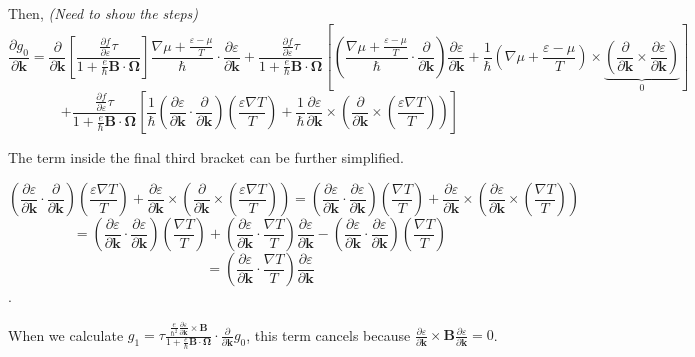 \documentclass[aps,pra,amsmath,amssymb,floatfix,twocolumn, amsmath, superscriptaddress, twocolumn]{revtex4-2}
\newcommand{\bvec}[1]{{\mathbf #1}}
\begin{document}
Then, \textit{(Need to show the steps)}
$$\frac{\partial g_0}{\partial \bvec{k}} = 
\frac{\partial}{\partial \bvec{k}} \left[ \frac{\frac{\partial f} {\partial \varepsilon} \tau}{1 + \frac{e}{\hbar} \bvec{B}\cdot\bvec{\Omega}}
\right] \frac{\nabla \mu + \frac{\varepsilon - \mu}{T}}{\hbar} \cdot \frac{\partial \varepsilon}{\partial \bvec{k}} + \frac{\frac{\partial f} {\partial \varepsilon} \tau}{1 + \frac{e}{\hbar} \bvec{B}\cdot\bvec{\Omega}} \left[(\frac{\nabla \mu + \frac{\varepsilon - \mu}{T}}{\hbar} \cdot \frac{\partial }{\partial \bvec{k}} )\frac{\partial \varepsilon}{\partial \bvec{k}} + \frac{1}{\hbar} (\nabla \mu + \frac{\varepsilon - \mu}{T})\times \underbrace{(\frac{\partial }{\partial \bvec{k}} \times \frac{\partial \varepsilon}{\partial \bvec{k}})}_0 \right]
$$
$$+ \frac{\frac{\partial f} {\partial \varepsilon} \tau}{1 + \frac{e}{\hbar} \bvec{B}\cdot\bvec{\Omega}} \left[\frac{1}{\hbar} (\frac{\partial \varepsilon}{\partial \bvec{k}} \cdot \frac{\partial }{\partial \bvec{k}}) (\frac{\varepsilon \nabla T}{T}) + \frac{1}{\hbar} \frac{\partial \varepsilon}{\partial \bvec{k}} \times \left(  \frac{\partial }{\partial \bvec{k}} \times \left(\frac{\varepsilon \nabla T}{T}\right) \right) \right]$$

The term inside the final third bracket can be further simplified.

$$ (\frac{\partial \varepsilon}{\partial \bvec{k}} \cdot \frac{\partial }{\partial \bvec{k}}) (\frac{\varepsilon \nabla T}{T}) + \frac{\partial \varepsilon}{\partial \bvec{k}} \times \left(  \frac{\partial }{\partial \bvec{k}} \times \left(\frac{\varepsilon \nabla T}{T}\right) \right) = (\frac{\partial \varepsilon}{\partial \bvec{k}} \cdot \frac{\partial \varepsilon}{\partial \bvec{k}}) (\frac{ \nabla T}{T}) + \frac{\partial \varepsilon}{\partial \bvec{k}} \times \left(  \frac{\partial \varepsilon}{\partial \bvec{k}} \times \left(\frac{\nabla T}{T}\right) \right)$$
$$  =(\frac{\partial \varepsilon}{\partial \bvec{k}} \cdot \frac{\partial \varepsilon}{\partial \bvec{k}}) (\frac{ \nabla T}{T}) + \left(  \frac{\partial \varepsilon}{\partial \bvec{k}} \cdot \frac{\nabla T}{T}\right) \frac{\partial \varepsilon}{\partial \bvec{k}} -  (\frac{\partial \varepsilon}{\partial \bvec{k}} \cdot \frac{\partial \varepsilon}{\partial \bvec{k}}) (\frac{ \nabla T}{T})$$
$$= \left(  \frac{\partial \varepsilon}{\partial \bvec{k}} \cdot \frac{\nabla T}{T}\right) \frac{\partial \varepsilon}{\partial \bvec{k}}$$.

When we calculate $g_1 = \tau \frac{\frac{e}{\hbar^2} \frac{\partial \varepsilon}{\partial \bvec{k}} \times \bvec{B}}{1 + \frac{e}{\hbar} \bvec{B}\cdot\bvec{\Omega}} \cdot\frac{\partial}{\partial \bvec{k}} g_0$, this term cancels because $\frac{\partial \varepsilon}{\partial \bvec{k}} \times \bvec{B}  \frac{\partial \varepsilon}{\partial \bvec{k}} = 0$.
\end{document}
